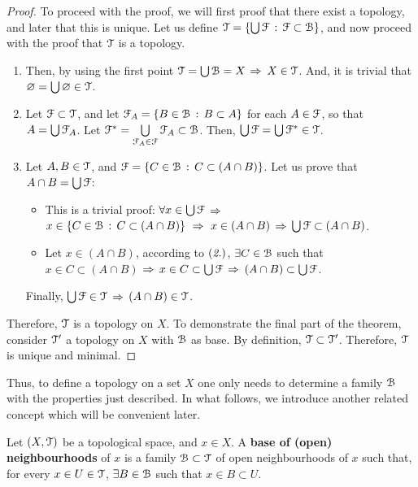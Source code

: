 \begin{proof}
	To proceed with the proof, we will first proof that there exist a topology, and later
	that this is unique.
	Let us define $\EuScript{T} = \{\bigcup \EuScript{F}\,:\,\EuScript{F}\subset \EuScript{B}\}$, and now proceed with the proof 
	that $\EuScript{T}$ is a topology.
	\begin{enumerate}
		\item Then, by using the first point $\EuScript{T} =\bigcup \EuScript{B}= X$ $\Rightarrow$ $X\in \EuScript{T}$. And, it
		is trivial that $\varnothing = \bigcup \varnothing \in \EuScript{T}$.
		
		\item Let $\EuScript{F}\subset \EuScript{T}$, and let $\EuScript{F}_A=\{B\in \EuScript{B}\,:\, B\subset A\}$ for each 
		$A\in\EuScript{F}$, so that $A=\bigcup\EuScript{F}_A$. Let $\EuScript{F}^*=\bigcup\limits_{\EuScript{F}_A\in\EuScript{F}}\EuScript{F}_A\subset\EuScript{B}$.
		Then,  $\bigcup \EuScript{F} =\bigcup\EuScript{F}^*\in\EuScript{T}$.
		
		\item Let $A, B\in \EuScript{T}$, and $\EuScript{F} = \{C\in\EuScript{B}\,:\, C \subset(A\cap B)\}$.
		Let us prove that $A\cap B = \bigcup\EuScript{F}$:
		\begin{itemize}
			\item[\boxed{\supseteq}] This is a trivial proof: $\forall x\in\bigcup\EuScript{F}$ $\Rightarrow$
			$x\in\left\{C\in\EuScript{B}\,:\,C\subset(A\cap B)\right\}\ \Rightarrow\ x\in (A\cap B)$ $\Rightarrow$ 
			$\bigcup\EuScript{F} \subset (A\cap B)$.
			\item[\boxed{\subseteq}] Let $x\in (A\cap B)$, according to $(\emph{2.})$, 
			$\exists C\in \EuScript{B}$ such that $x\in C\subset (A\cap B)$ $\Rightarrow$ $x\in C\subset 
			\bigcup\EuScript{F}$ $\Rightarrow$ $(A\cap B)\subset \bigcup\EuScript{F}$.
		\end{itemize}
		Finally, $\bigcup \EuScript{F}\in \EuScript{T}$ $\Rightarrow$ $(A\cap B) \in \EuScript{T}$.
	\end{enumerate}
	Therefore, $\EuScript{T}$ is a topology on $X$.
	To demonstrate the final part of the theorem, consider $\EuScript{T}'$ a topology on $X$ with 
	$\EuScript{B}$ as base. By definition, $\EuScript{T}\subset \EuScript{T}'$. Therefore, $\EuScript{T}$ is unique and minimal.
\end{proof}

Thus, to define a topology on a set $X$ one only needs to determine a family $\EuScript{B}$ with 
the properties just described.
In what follows, we introduce another related concept which will be convenient later.
\begin{definition}
	\label{def:base-open-neighbourhoods}
	Let $(X, \EuScript{T})$ be a topological space, and $x\in X$.
	A \textbf{base of (open) neighbourhoods} of $x$ is a family $\EuScript{B}\subset\EuScript{T}$ of open 
	neighbourhoods of $x$ such that, for every $x\in U\in \EuScript{T}$, $\exists B\in\EuScript{B}$ such that
	$x\in B\subset U$.
\end{definition}


